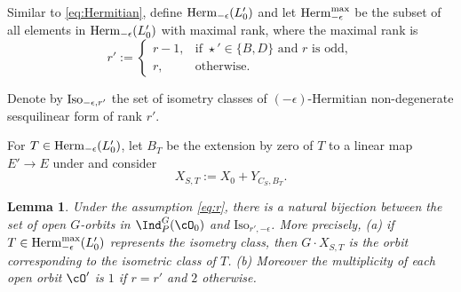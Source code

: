 \documentclass[11pt,a4paper]{amsart}
\numberwithin{equation}{section}
\newtheorem{lem}[thm]{Lemma}
\theoremstyle{remark}
\begin{document}
Similar to \eqref{eq:Hermitian}, define $\mathrm{Herm}_{-\epsilon}(L'_0)$ and let 
$\mathrm{Herm}_{-\epsilon}^{\mathrm{max}}$ be the subset of all elements in $\mathrm{Herm}_{-\epsilon}(L'_0)$ with maximal rank, where the maximal rank is
\[
r' := 
\begin{cases}
r-1, & \text{if } \star' \in \{B,D\} \text{ and } r \text{ is odd},\\
r, & \text{otherwise}.
\end{cases}
\]

Denote by $\mathrm{Iso}_{-\epsilon,r'}$ the set of isometry classes of $(-\epsilon)$-Hermitian non-degenerate sesquilinear form of rank $r'$.  

For $T\in\mathrm{Herm}_{-\epsilon}(L'_0)$, let $B_T$ be the extension by zero of $T$ 
to a linear map $E' \to E$ under and consider  
\begin{equation}\label{eq:XST}
X_{S,T}:=X_0+Y_{C_S,B_T}.                           
\end{equation}


\begin{lem}\label{lem:app-open-locus}
  Under the assumption \eqref{eq:r}, there is a natural bijection between the set of open $G$-orbits in $\Ind_P^G(\cO_0)$ and $\mathrm{Iso}_{r',-\epsilon}$.
   More precisely, 
(a) if $T\in \mathrm{Herm}_{-\epsilon}^{\mathrm{max}}(L'_0)$ represents the isometry class, then $G\cdot X_{S,T}$ is the orbit corresponding to the isometric class of $T$.
(b)
  Moreover the multiplicity of each open orbit $\cO'$ is $1$ if $r = r'$ and $2$ otherwise. 
\end{lem}
\end{document}
